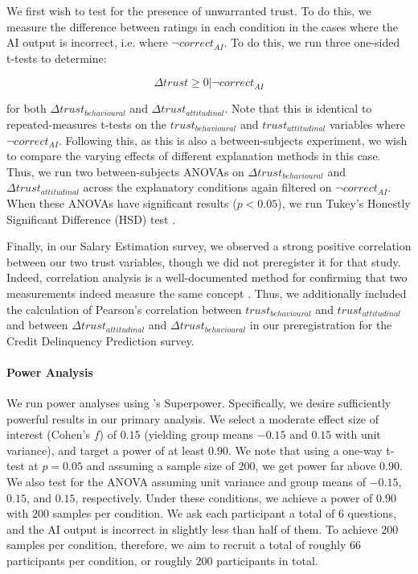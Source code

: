 We first wish to test for the presence of unwarranted trust. To do this, we measure the difference between ratings in each condition in the cases where the AI output is incorrect, i.e. where $\neg correct_{AI}$. To do this, we run three one-sided t-tests \cite{caldwell_power_nodate} to determine:

\begin{equation}
    \Delta trust \geq 0 | \neg correct_{AI}
\end{equation}

\noindent for both $\Delta trust_{behavioural}$ and $\Delta trust_{attitudinal}$. Note that this is identical to repeated-measures t-tests on the $trust_{behavioural}$ and $trust_{attitudinal}$ variables where $\neg correct_{AI}$. Following this, as this is also a between-subjects experiment, we wish to compare the varying effects of different explanation methods in this case. Thus, we run two between-subjects ANOVAs \cite{caldwell_power_nodate} on $\Delta trust_{behavioural}$ and $\Delta trust_{attitudinal}$ across the explanatory conditions again filtered on $\neg correct_{AI}$. When these ANOVAs have significant results ($p < 0.05$), we run Tukey's Honestly Significant Difference (HSD) test \cite{caldwell_power_nodate}.

Finally, in our Salary Estimation survey, we observed a strong positive correlation between our two trust variables, though we did not preregister it for that study. Indeed, correlation analysis is a well-documented method for confirming that two measurements indeed measure the same concept \cite{westen_quantifying_2003, morata-ramirez_construct_2013}. Thus, we additionally included the calculation of Pearson's correlation between $trust_{behavioural}$ and $trust_{attitudinal}$ and between $\Delta trust_{attitudinal}$ and $\Delta trust_{behavioural}$ in our preregistration for the Credit Delinquency Prediction survey. 

\paragraph{Power Analysis}
We run power analyses using \textcite{caldwell_power_nodate}'s Superpower. Specifically, we desire sufficiently powerful results in our primary analysis. We select a moderate effect size of interest (Cohen's $f$) of $0.15$ (yielding group means $-0.15$ and $0.15$ with unit variance), and target a power of at least $0.90$. We note that using a one-way t-test at $p = 0.05$ and assuming a sample size of $200$, we get power far above $0.90$. We also test for the ANOVA assuming unit variance and group means of $-0.15$, $0.15$, and $0.15$, respectively. Under these conditions, we achieve a power of $0.90$ with $200$ samples per condition. We ask each participant a total of 6 questions, and the AI output is incorrect in slightly less than half of them. To achieve $200$ samples per condition, therefore, we aim to recruit a total of roughly $66$ participants per condition, or roughly $200$ participants in total.


